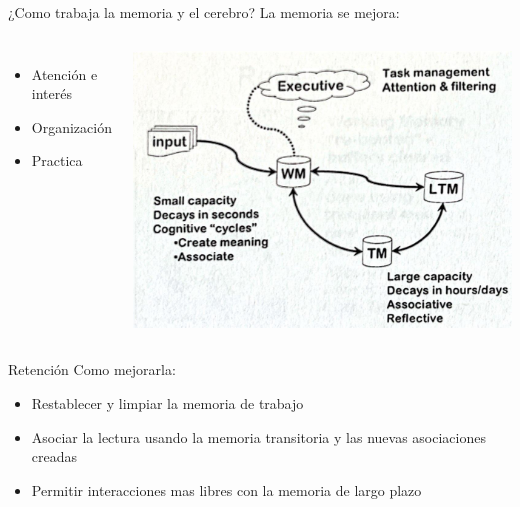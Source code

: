\documentclass[
10pt,
aspectratio=169,
]{beamer}
\begin{document}
\begin{frame}[c]{¿Como trabaja la memoria y el cerebro?}
La memoria se mejora:
\begin{columns}
\begin{itemize}
\item Atenci\'on e inter\'es
\item Organizaci\'on 
\item Practica
\end{itemize}
\centering
\includegraphics[width=\textwidth]{fig3.jpeg}
\end{columns}
\end{frame}


\begin{frame}[c]{Retenci\'on}
Como mejorarla:
\begin{itemize}
\item Restablecer y limpiar la \alert{memoria de trabajo}
\item Asociar la lectura usando la \alert{memoria transitoria} y las nuevas asociaciones creadas
\item Permitir interacciones mas libres con la \alert{memoria de largo plazo}
\end{itemize}
\end{frame}

\end{document}
